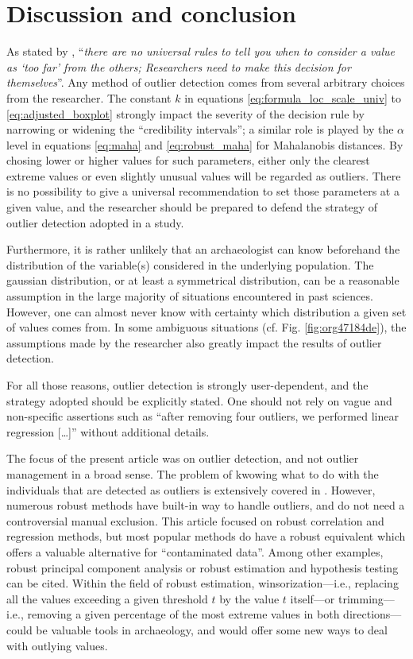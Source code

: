 \documentclass[review, 3p]{elsarticle}
\begin{document}
\section{Discussion and conclusion}
\label{sec:org2d38802}
As stated by \citet[][p.5]{leys2019_HowClassifyDetect}, ``\emph{there are no universal rules to tell you when to consider a value as ‘too far’ from the others; Researchers need to make this decision for themselves}''. Any method of outlier detection comes from several arbitrary choices from the researcher. The constant \(k\) in equations \eqref{eq:formula_loc_scale_univ} to \eqref{eq:adjusted_boxplot} strongly impact the severity of the decision rule by narrowing or widening the ``credibility intervals''; a similar role is played by the \(\alpha\) level in equations \eqref{eq:maha} and \eqref{eq:robust_maha} for Mahalanobis distances. By chosing lower or higher values for such parameters, either only the clearest extreme values or even slightly unusual values will be regarded as outliers. There is no possibility to give a universal recommendation to set those parameters at a given value, and the researcher should be prepared to defend the strategy of outlier detection adopted in a study.

Furthermore, it is rather unlikely that an archaeologist can know beforehand the distribution of the variable(s) considered in the underlying population. The gaussian distribution, or at least a symmetrical distribution, can be a reasonable assumption in the large majority of situations encountered in past sciences. However, one can almost never know with certainty which distribution a given set of values comes from. In some ambiguous situations (cf. Fig. \ref{fig:org47184de}), the assumptions made by the researcher also greatly impact the results of outlier detection.

For all those reasons, outlier detection is strongly user-dependent, and the strategy adopted should be explicitly stated. One should not rely on vague and non-specific assertions such as ``after removing four outliers, we performed linear regression [\ldots{}]'' without additional details.

The focus of the present article was on outlier detection, and not outlier management in a broad sense. The problem of kwowing what to do with the individuals that are detected as outliers is extensively covered in \cite{leys2019_HowClassifyDetect}. However, numerous robust methods have built-in way to handle outliers, and do not need a controversial manual exclusion. This article focused on robust correlation and regression methods, but most popular methods do have a robust equivalent which offers a valuable alternative for ``contaminated data''. Among other examples, robust principal component analysis \citep{candes2011_RobustPrincipalComponent} or robust estimation and hypothesis testing \citep{wilcox2012_IntroductionRobustEstimation} can be cited. Within the field of robust estimation, winsorization---i.e., replacing all the values exceeding a given threshold \(t\) by the value \(t\) itself---or trimming---i.e., removing a given percentage of the most extreme values in both directions---could be valuable tools in archaeology, and would offer some new ways to deal with outlying values.
\end{document}
